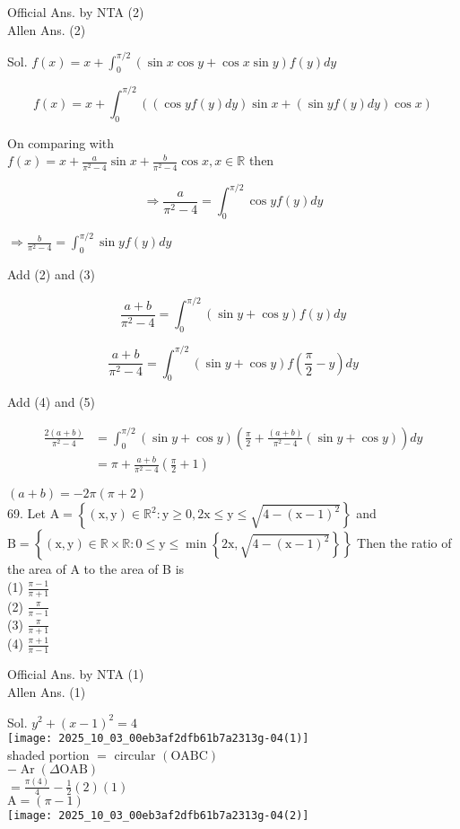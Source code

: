 \documentclass[10pt]{article}
\begin{document}
Official Ans. by NTA (2)\\
Allen Ans. (2)

Sol. \(f(x)=x+\int_{0}^{\pi / 2}(\sin x \cos y+\cos x \sin y) f(y) d y\)

\[
f(x)=x+\int_{0}^{\pi / 2}((\cos y f(y) d y) \sin x+(\sin y f(y) d y) \cos x)
\]

On comparing with\\
\(f(x)=x+\frac{a}{\pi^{2}-4} \sin x+\frac{b}{\pi^{2}-4} \cos x, x \in \mathbb{R}\) then

\[
\Rightarrow \frac{a}{\pi^{2}-4}=\int_{0}^{\pi / 2} \cos y f(y) d y
\]

\(\Rightarrow \frac{b}{\pi^{2}-4}=\int_{0}^{\pi / 2} \sin y f(y) d y\)

Add (2) and (3)

\[
\frac{a+b}{\pi^{2}-4}=\int_{0}^{\pi / 2}(\sin y+\cos y) f(y) d y
\]

\[
\frac{a+b}{\pi^{2}-4}=\int_{0}^{\pi / 2}(\sin y+\cos y) f\left(\frac{\pi}{2}-y\right) d y
\]

Add (4) and (5)

\[
\begin{aligned}
\frac{2(a+b)}{\pi^{2}-4} & =\int_{0}^{\pi / 2}(\sin y+\cos y)\left(\frac{\pi}{2}+\frac{(a+b)}{\pi^{2}-4}(\sin y+\cos y)\right) d y \\
& =\pi+\frac{a+b}{\pi^{2}-4}\left(\frac{\pi}{2}+1\right)
\end{aligned}
\]

\((a+b)=-2 \pi(\pi+2)\)\\
69. Let \(\mathrm{A}=\left\{(\mathrm{x}, \mathrm{y}) \in \mathbb{R}^{2}: \mathrm{y} \geq 0,2 \mathrm{x} \leq \mathrm{y} \leq \sqrt{4-(\mathrm{x}-1)^{2}}\right\}\) and \(\mathrm{B}=\left\{(\mathrm{x}, \mathrm{y}) \in \mathbb{R} \times \mathbb{R}: 0 \leq \mathrm{y} \leq \min \left\{2 \mathrm{x}, \sqrt{4-(\mathrm{x}-1)^{2}}\right\}\right\}\) Then the ratio of the area of A to the area of B is\\
(1) \(\frac{\pi-1}{\pi+1}\)\\
(2) \(\frac{\pi}{\pi-1}\)\\
(3) \(\frac{\pi}{\pi+1}\)\\
(4) \(\frac{\pi+1}{\pi-1}\)

Official Ans. by NTA (1)\\
Allen Ans. (1)

Sol. \(y^{2}+(x-1)^{2}=4\)\\
\texttt{[image: 2025\_10\_03\_00eb3af2dfb61b7a2313g-04(1)]}\\
shaded portion \(=\) circular \((\mathrm{OABC})\)\\
\(-\operatorname{Ar}(\Delta \mathrm{OAB})\)\\
\(=\frac{\pi(4)}{4}-\frac{1}{2}(2)(1)\)\\
\(\mathrm{A}=(\pi-1)\)\\
\texttt{[image: 2025\_10\_03\_00eb3af2dfb61b7a2313g-04(2)]}
\end{document}
